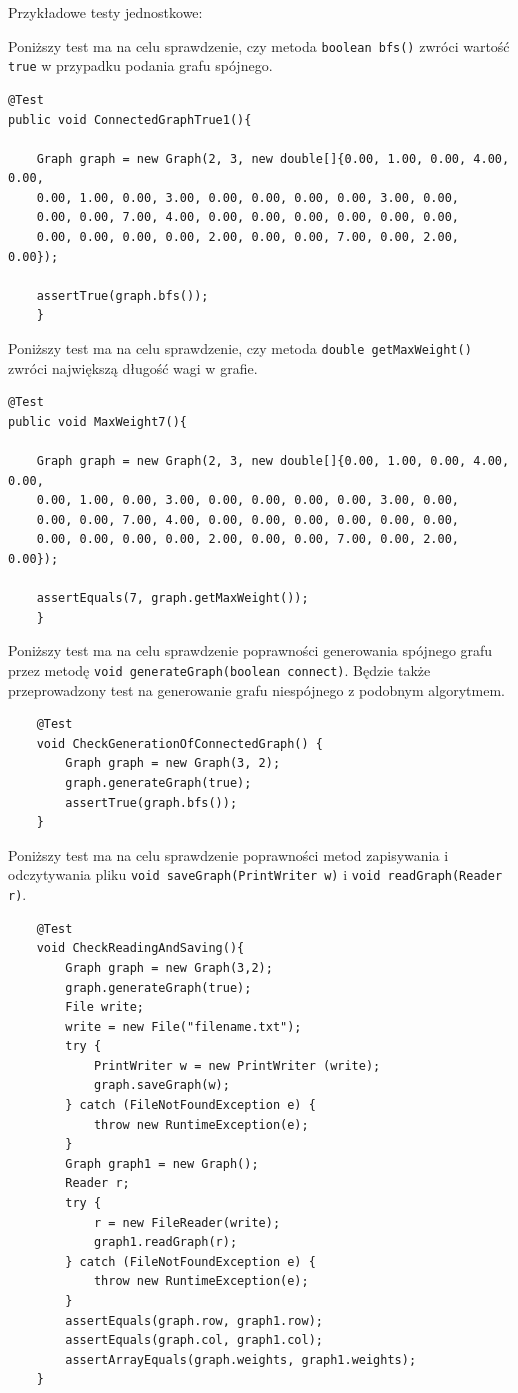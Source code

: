 \documentclass[]{article}
\begin{document}
Przykładowe testy jednostkowe:

Poniższy test ma na celu sprawdzenie, czy metoda \texttt{boolean bfs()} zwróci wartość \texttt{true} w przypadku podania grafu spójnego.

\begin{verbatim}
@Test
public void ConnectedGraphTrue1(){
    
    Graph graph = new Graph(2, 3, new double[]{0.00, 1.00, 0.00, 4.00, 0.00,
    0.00, 1.00, 0.00, 3.00, 0.00, 0.00, 0.00, 0.00, 3.00, 0.00,
    0.00, 0.00, 7.00, 4.00, 0.00, 0.00, 0.00, 0.00, 0.00, 0.00,
    0.00, 0.00, 0.00, 0.00, 2.00, 0.00, 0.00, 7.00, 0.00, 2.00, 0.00});
        
    assertTrue(graph.bfs());
    }
\end{verbatim}

Poniższy test ma na celu sprawdzenie, czy metoda \texttt{double getMaxWeight()} zwróci największą długość wagi w grafie.

\begin{verbatim}
@Test
public void MaxWeight7(){
    
    Graph graph = new Graph(2, 3, new double[]{0.00, 1.00, 0.00, 4.00, 0.00,
    0.00, 1.00, 0.00, 3.00, 0.00, 0.00, 0.00, 0.00, 3.00, 0.00,
    0.00, 0.00, 7.00, 4.00, 0.00, 0.00, 0.00, 0.00, 0.00, 0.00,
    0.00, 0.00, 0.00, 0.00, 2.00, 0.00, 0.00, 7.00, 0.00, 2.00, 0.00});
        
    assertEquals(7, graph.getMaxWeight());
    }
\end{verbatim}

Poniższy test ma na celu sprawdzenie poprawności generowania spójnego grafu przez metodę \texttt{void generateGraph(boolean connect)}. Będzie także przeprowadzony test na generowanie grafu niespójnego z podobnym algorytmem.
\begin{verbatim}
    @Test
    void CheckGenerationOfConnectedGraph() {
        Graph graph = new Graph(3, 2);
        graph.generateGraph(true);
        assertTrue(graph.bfs());
    }
\end{verbatim}

Poniższy test ma na celu sprawdzenie poprawności metod zapisywania i odczytywania pliku \texttt{void saveGraph(PrintWriter w)} i \texttt{void readGraph(Reader r)}. 
\begin{verbatim}
    @Test
    void CheckReadingAndSaving(){
        Graph graph = new Graph(3,2);
        graph.generateGraph(true);
        File write;
        write = new File("filename.txt");
        try {
            PrintWriter w = new PrintWriter (write);
            graph.saveGraph(w);
        } catch (FileNotFoundException e) {
            throw new RuntimeException(e);
        }
        Graph graph1 = new Graph();
        Reader r;
        try {
            r = new FileReader(write);
            graph1.readGraph(r);
        } catch (FileNotFoundException e) {
            throw new RuntimeException(e);
        }
        assertEquals(graph.row, graph1.row);
        assertEquals(graph.col, graph1.col);
        assertArrayEquals(graph.weights, graph1.weights);
    }
\end{verbatim}
\end{document}
